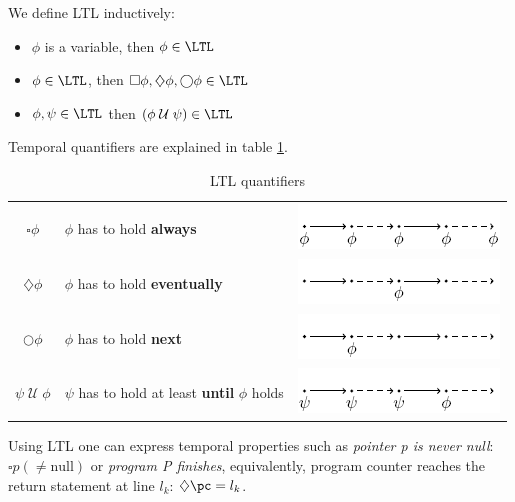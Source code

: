 
\newcommand{\U}{\;\mathcal{U}\;}

\begin{defn}
	We define \gls{LTL} inductively:

	\begin{itemize}
		\item $\phi$ is a variable, then $\phi\in \LTL$
		\item $\phi\in \LTL$, then $\square \phi,\diamondsuit \phi, \bigcirc \phi \in \LTL$
		\item $\phi,\psi\in \LTL$ then $(\phi \U \psi)\in \LTL$
	\end{itemize}

	Temporal quantifiers are explained in table \ref{tabl:ltl}.

\end{defn}


\begin{table}[hbtp]
\centering
\begin{tabular}{c|lr}
$\square \phi$ & $\phi$ has to hold \textbf{always} & \includegraphics[scale=0.5]{graphics/Ltlalways.png}\\ 
$\diamondsuit \phi$ & $\phi$ has to hold \textbf{eventually} & \includegraphics[scale=0.5]{graphics/Ltlevently.png}\\ 
$\bigcirc \phi$ & $\phi$ has to hold \textbf{next} & \includegraphics[scale=0.5]{graphics/Ltlnext.png}\\ 
$\psi\U\phi$ & $\psi$ has to hold at least \textbf{until} $\phi$ holds & \includegraphics[scale=0.5]{graphics/Ltluntil.png}\\ 
\end{tabular}
\caption{\gls{LTL} quantifiers}
\label{tabl:ltl}
\end{table}


Using \gls{LTL} one can express temporal properties such as 
%
\textit{pointer p is never null}: $\square p (\neq \mbox{null})$ or 
%
\textit{program P finishes}, equivalently, 
%
	program counter reaches the return statement at line $l_k$: $\diamondsuit\pc = l_k$.




